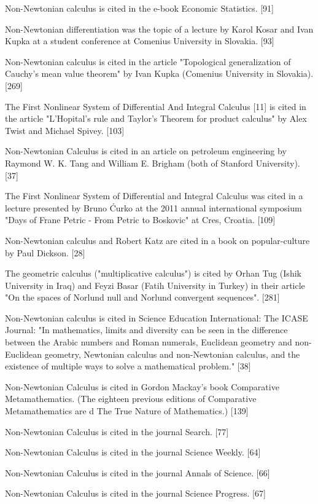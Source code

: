 \documentclass[12pt]{article}
\begin{document}
Non-Newtonian calculus is cited in the e-book Economic Statistics. [91]

Non-Newtonian differentiation was the topic of a lecture by Karol Kosar and Ivan Kupka at a student conference at Comenius University in Slovakia. [93]

Non-Newtonian calculus is cited in the article "Topological generalization of Cauchy's mean value theorem" by Ivan Kupka (Comenius University in Slovakia). [269]

The First Nonlinear System of Differential And Integral Calculus [11] is cited in the article "L'Hopital's rule and Taylor's Theorem for product calculus" by Alex Twist and Michael Spivey. [103] 

Non-Newtonian Calculus is cited in an article on petroleum engineering by Raymond W. K. Tang and William E. Brigham (both of Stanford University). [37]

The First Nonlinear System of Differential and Integral Calculus was cited in a lecture presented by Bruno Ćurko at the 2011 annual international symposium "Days of Frane Petric - From Petric to Boskovic" at Cres, Croatia. [109] 

Non-Newtonian calculus and Robert Katz are cited in a book on popular-culture by Paul Dickson. [28]


The geometric calculus ("multiplicative calculus") is cited by Orhan Tug (Ishik University in Iraq) and Feyzi Basar (Fatih University in Turkey) in their article "On the spaces of Norlund null and Norlund convergent sequences". [281]

Non-Newtonian calculus is cited in Science Education International: The ICASE Journal: "In mathematics, limits and diversity can be seen in the difference between the Arabic numbers and Roman numerals, Euclidean geometry and non-Euclidean geometry, Newtonian calculus and non-Newtonian calculus, and the existence of multiple ways to solve a mathematical problem." [38]

Non-Newtonian Calculus is cited in Gordon Mackay's book Comparative Metamathematics. (The eighteen previous editions of Comparative Metamathematics are d The True Nature of Mathematics.) [139]

Non-Newtonian Calculus is cited in the journal Search. [77]

Non-Newtonian Calculus is cited in the journal Science Weekly. [64]

Non-Newtonian Calculus is cited in the journal Annals of Science. [66]

Non-Newtonian Calculus is cited in the journal Science Progress. [67]
\end{document}
